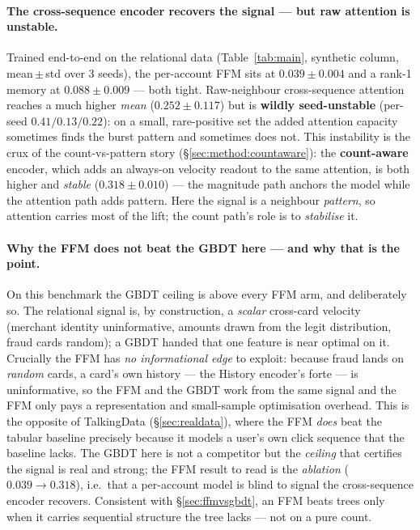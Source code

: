 \paragraph{The cross-sequence encoder recovers the signal --- but raw attention is unstable.}
Trained end-to-end on the relational data (Table~\ref{tab:main}, synthetic column, mean\,$\pm$\,std
over 3 seeds), the per-account FFM sits at $0.039\pm0.004$ and a rank-1 memory at $0.088\pm0.009$
--- both tight. Raw-neighbour cross-sequence attention reaches a much higher \emph{mean}
($0.252\pm0.117$) but is \textbf{wildly seed-unstable} (per-seed $0.41/0.13/0.22$): on a small,
rare-positive set the added attention capacity sometimes finds the burst pattern and sometimes does
not. This instability is the crux of the count-vs-pattern story (\S\ref{sec:method:countaware}):
the \textbf{count-aware} encoder, which adds an always-on velocity readout to the same attention,
is both higher and \emph{stable} ($0.318\pm0.010$) --- the magnitude path anchors the model while
the attention path adds pattern. Here the signal is a neighbour \emph{pattern}, so attention
carries most of the lift; the count path's role is to \emph{stabilise} it.

\paragraph{Why the FFM does not beat the GBDT here --- and why that is the point.} On this
benchmark the GBDT ceiling is above every FFM arm, and deliberately so. The relational signal is,
by construction, a \emph{scalar} cross-card velocity (merchant identity uninformative, amounts
drawn from the legit distribution, fraud cards random); a GBDT handed that one feature is near
optimal on it. Crucially the FFM has \emph{no informational edge} to exploit: because fraud lands
on \emph{random} cards, a card's own history --- the History encoder's forte --- is uninformative,
so the FFM and the GBDT work from the same signal and the FFM only pays a representation and
small-sample optimisation overhead. This is the opposite of TalkingData (\S\ref{sec:realdata}),
where the FFM \emph{does} beat the tabular baseline precisely because it models a user's own click
sequence that the baseline lacks. The GBDT here is not a competitor but the \emph{ceiling} that
certifies the signal is real and strong; the FFM result to read is the \emph{ablation}
($0.039\!\to\!0.318$), i.e.\ that a per-account model is blind to signal the cross-sequence encoder
recovers. Consistent with \S\ref{sec:ffmvsgbdt}, an FFM beats trees only when it carries sequential
structure the tree lacks --- not on a pure count.
